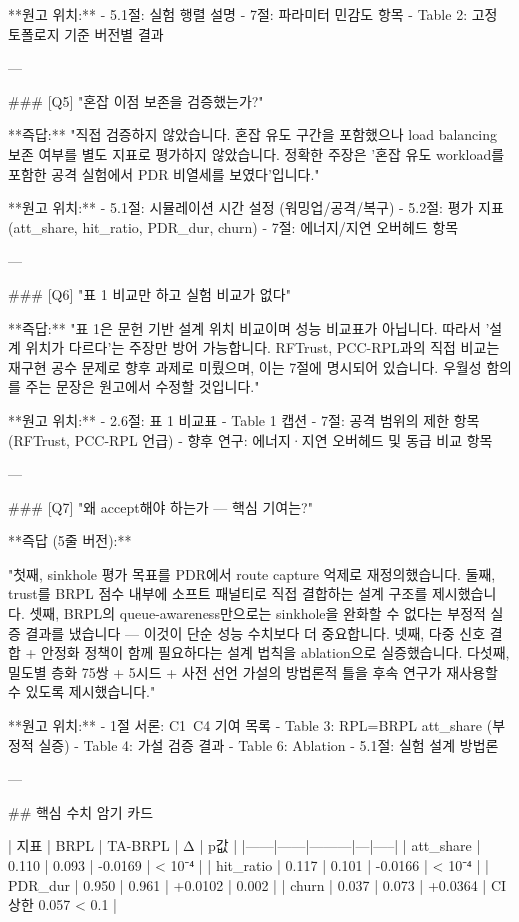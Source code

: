 **원고 위치:**
- 5.1절: 실험 행렬 설명
- 7절: 파라미터 민감도 항목
- Table 2: 고정 토폴로지 기준 버전별 결과

---

### [Q5] "혼잡 이점 보존을 검증했는가?"

**즉답:**
"직접 검증하지 않았습니다.
혼잡 유도 구간을 포함했으나 load balancing 보존 여부를
별도 지표로 평가하지 않았습니다.
정확한 주장은 '혼잡 유도 workload를 포함한 공격 실험에서
PDR 비열세를 보였다'입니다."

**원고 위치:**
- 5.1절: 시뮬레이션 시간 설정 (워밍업/공격/복구)
- 5.2절: 평가 지표 (att_share, hit_ratio, PDR_dur, churn)
- 7절: 에너지/지연 오버헤드 항목

---

### [Q6] "표 1 비교만 하고 실험 비교가 없다"

**즉답:**
"표 1은 문헌 기반 설계 위치 비교이며 성능 비교표가 아닙니다.
따라서 '설계 위치가 다르다'는 주장만 방어 가능합니다.
RFTrust, PCC-RPL과의 직접 비교는 재구현 공수 문제로
향후 과제로 미뤘으며, 이는 7절에 명시되어 있습니다.
우월성 함의를 주는 문장은 원고에서 수정할 것입니다."

**원고 위치:**
- 2.6절: 표 1 비교표
- Table 1 캡션
- 7절: 공격 범위의 제한 항목 (RFTrust, PCC-RPL 언급)
- 향후 연구: 에너지·지연 오버헤드 및 동급 비교 항목

---

### [Q7] "왜 accept해야 하는가 — 핵심 기여는?"

**즉답 (5줄 버전):**

"첫째, sinkhole 평가 목표를 PDR에서 route capture 억제로 재정의했습니다.
둘째, trust를 BRPL 점수 내부에 소프트 패널티로 직접 결합하는
설계 구조를 제시했습니다.
셋째, BRPL의 queue-awareness만으로는 sinkhole을 완화할 수 없다는
부정적 실증 결과를 냈습니다 — 이것이 단순 성능 수치보다 더 중요합니다.
넷째, 다중 신호 결합 + 안정화 정책이 함께 필요하다는 설계 법칙을
ablation으로 실증했습니다.
다섯째, 밀도별 층화 75쌍 + 5시드 + 사전 선언 가설의 방법론적 틀을
후속 연구가 재사용할 수 있도록 제시했습니다."

**원고 위치:**
- 1절 서론: C1~C4 기여 목록
- Table 3: RPL=BRPL att_share (부정적 실증)
- Table 4: 가설 검증 결과
- Table 6: Ablation
- 5.1절: 실험 설계 방법론

---

## 핵심 수치 암기 카드

| 지표 | BRPL | TA-BRPL | Δ | p값 |
|------|------|---------|---|-----|
| att_share | 0.110 | 0.093 | -0.0169 | < 10⁻⁴ |
| hit_ratio | 0.117 | 0.101 | -0.0166 | < 10⁻⁴ |
| PDR_dur | 0.950 | 0.961 | +0.0102 | 0.002 |
| churn | 0.037 | 0.073 | +0.0364 | CI 상한 0.057 < 0.1 |

